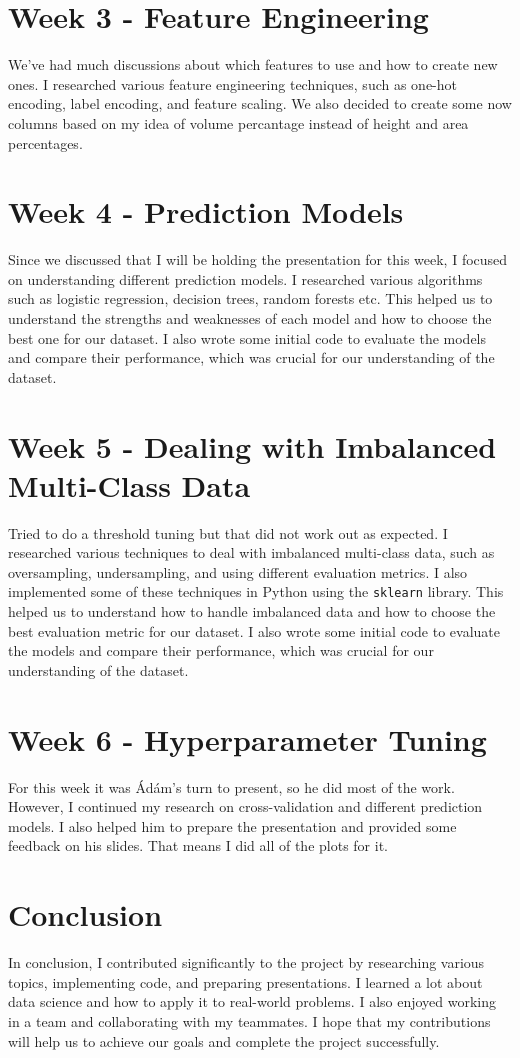 \documentclass[a4paper,12pt]{article}
\begin{document}
\section{Week 3 - Feature Engineering}
We've had much discussions about which features to use and how to create new ones. I researched various feature engineering techniques, such as one-hot encoding, label encoding, and feature scaling. We also decided to create some now columns based on my idea of volume percantage instead of height and area percentages. 

\section{Week 4 - Prediction Models}
Since we discussed that I will be holding the presentation for this week, I focused on understanding different prediction models. I researched various algorithms such as logistic regression, decision trees, random forests etc. This helped us to understand the strengths and weaknesses of each model and how to choose the best one for our dataset. I also wrote some initial code to evaluate the models and compare their performance, which was crucial for our understanding of the dataset.

\section{Week 5 - Dealing with Imbalanced Multi-Class Data}
Tried to do a threshold tuning but that did not work out as expected. I researched various techniques to deal with imbalanced multi-class data, such as oversampling, undersampling, and using different evaluation metrics. I also implemented some of these techniques in Python using the \texttt{sklearn} library. This helped us to understand how to handle imbalanced data and how to choose the best evaluation metric for our dataset. I also wrote some initial code to evaluate the models and compare their performance, which was crucial for our understanding of the dataset.

\section{Week 6 - Hyperparameter Tuning}
For this week it was Ádám's turn to present, so he did most of the work. However, I continued my research on cross-validation and different prediction models. I also helped him to prepare the presentation and provided some feedback on his slides. That means I did all of the plots for it. 

\section{Conclusion}
In conclusion, I contributed significantly to the project by researching various topics, implementing code, and preparing presentations. I learned a lot about data science and how to apply it to real-world problems. I also enjoyed working in a team and collaborating with my teammates. I hope that my contributions will help us to achieve our goals and complete the project successfully.

%
%
\end{document}
